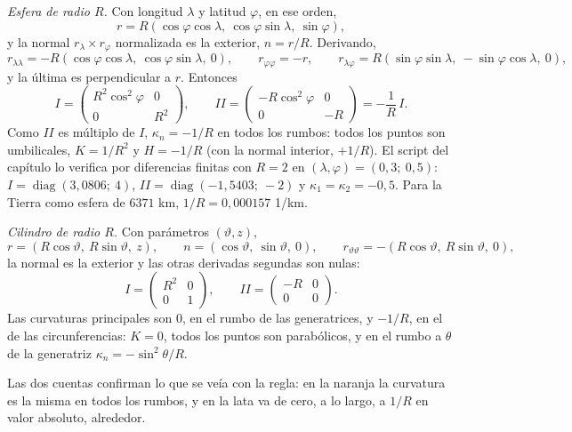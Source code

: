 \begin{ejemplo}\label{ej:curv-esfera-cilindro}
\emph{Esfera de radio \(R\).} Con longitud \(\lambda\) y latitud \(\varphi\), en ese orden,
\[
  r=R(\cos\varphi\cos\lambda,\ \cos\varphi\sin\lambda,\ \sin\varphi),
\]
y la normal \(r_\lambda\times r_\varphi\) normalizada es la exterior, \(n=r/R\). Derivando,
\[
  r_{\lambda\lambda}=-R(\cos\varphi\cos\lambda,\ \cos\varphi\sin\lambda,\ 0),\qquad
  r_{\varphi\varphi}=-r,\qquad
  r_{\lambda\varphi}=R(\sin\varphi\sin\lambda,\ -\sin\varphi\cos\lambda,\ 0),
\]
y la última es perpendicular a \(r\). Entonces
\[
  I=\begin{pmatrix}R^2\cos^2\varphi&0\\0&R^2\end{pmatrix},\qquad
  II=\begin{pmatrix}-R\cos^2\varphi&0\\0&-R\end{pmatrix}=-\frac1R\,I .
\]
Como \(II\) es múltiplo de \(I\), \(\kappa_n=-1/R\) en todos los rumbos: todos los puntos son
umbilicales, \(K=1/R^2\) y \(H=-1/R\) (con la normal interior, \(+1/R\)). El script del
capítulo lo verifica por diferencias finitas con \(R=2\) en \((\lambda,\varphi)=(0{,}3;\ 0{,}5)\):
\(I=\operatorname{diag}(3{,}0806;\ 4)\), \(II=\operatorname{diag}(-1{,}5403;\ -2)\) y
\(\kappa_1=\kappa_2=-0{,}5\). Para la Tierra como esfera de \(6371\) km,
\(1/R=0{,}000157\) 1/km.

\emph{Cilindro de radio \(R\).} Con parámetros \((\vartheta,z)\),
\[
  r=(R\cos\vartheta,\ R\sin\vartheta,\ z),\qquad n=(\cos\vartheta,\ \sin\vartheta,\ 0),\qquad
  r_{\vartheta\vartheta}=-(R\cos\vartheta,\ R\sin\vartheta,\ 0),
\]
la normal es la exterior y las otras derivadas segundas son nulas:
\[
  I=\begin{pmatrix}R^2&0\\0&1\end{pmatrix},\qquad II=\begin{pmatrix}-R&0\\0&0\end{pmatrix}.
\]
Las curvaturas principales son \(0\), en el rumbo de las generatrices, y \(-1/R\), en el de
las circunferencias: \(K=0\), todos los puntos son parabólicos, y en el rumbo a \(\theta\) de
la generatriz \(\kappa_n=-\sin^2\theta/R\).
\end{ejemplo}

Las dos cuentas confirman lo que se veía con la regla: en la naranja la curvatura es la misma
en todos los rumbos, y en la lata va de cero, a lo largo, a \(1/R\) en valor absoluto, alrededor.

